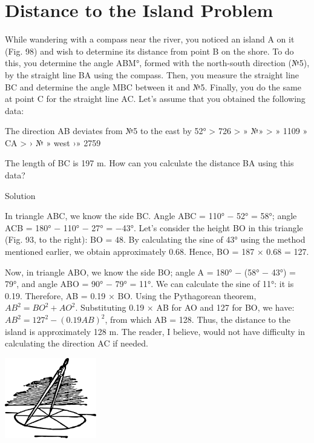 \section{Distance to the Island Problem}

While wandering with a compass near the river, you noticed an island A on it (Fig. 98) and wish to determine its distance from point B on the shore. To do this, you determine the angle ABM°, formed with the north-south direction (№5), by the straight line BA using the compass. Then, you measure the straight line BC and determine the angle MBC between it and №5. Finally, you do the same at point C for the straight line AC. Let's assume that you obtained the following data:

The direction AB deviates from №5 to the east by 52° > 726 > » №» > » 1109 » CA > › № » west ›» 2759

The length of BC is 197 m. How can you calculate the distance BA using this data?

Solution

In triangle ABC, we know the side BC. Angle ABC = 110° − 52° = 58°; angle ACB = 180° − 110° − 27° = −43°. Let's consider the height BO in this triangle (Fig. 93, to the right): BO = 48. By calculating the sine of 43° using the method mentioned earlier, we obtain approximately 0.68. Hence, BO = 187 × 0.68 = 127.

Now, in triangle ABO, we know the side BO; angle A = 180° − (58° − 43°) = 79°, and angle ABO = 90° − 79° = 11°. We can calculate the sine of 11°: it is 0.19. Therefore, AB = 0.19 × BO. Using the Pythagorean theorem, $AB^2 = BO^2 + AO^2$. Substituting 0.19 × AB for AO and 127 for BO, we have: $AB^2 = 127^2 − (0.19AB)^2$, from which AB = 128. Thus, the distance to the island is approximately 128 m. The reader, I believe, would not have difficulty in calculating the direction AC if needed.

\begin{center}
\includegraphics[width=0.3\textwidth]{figures/ch-05/fig-ch-05-tail.pdf}
\end{center}


















